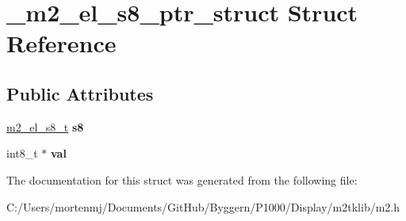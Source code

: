 \hypertarget{struct__m2__el__s8__ptr__struct}{\section{\-\_\-m2\-\_\-el\-\_\-s8\-\_\-ptr\-\_\-struct Struct Reference}
\label{struct__m2__el__s8__ptr__struct}
}
\subsection*{Public Attributes}
\begin{DoxyCompactItemize}
\item 
\hypertarget{struct__m2__el__s8__ptr__struct_ab247a5682b4e206da41bad5b5a96411c}{\hyperlink{struct__m2__el__s8__struct}{m2\-\_\-el\-\_\-s8\-\_\-t} {\bfseries s8}}\label{struct__m2__el__s8__ptr__struct_ab247a5682b4e206da41bad5b5a96411c}

\item 
\hypertarget{struct__m2__el__s8__ptr__struct_aa39562cbbd23f1c39070b525f1443427}{int8\-\_\-t $\ast$ {\bfseries val}}\label{struct__m2__el__s8__ptr__struct_aa39562cbbd23f1c39070b525f1443427}

\end{DoxyCompactItemize}


The documentation for this struct was generated from the following file\-:\begin{DoxyCompactItemize}
\item 
C\-:/\-Users/mortenmj/\-Documents/\-Git\-Hub/\-Byggern/\-P1000/\-Display/m2tklib/m2.\-h\end{DoxyCompactItemize}
